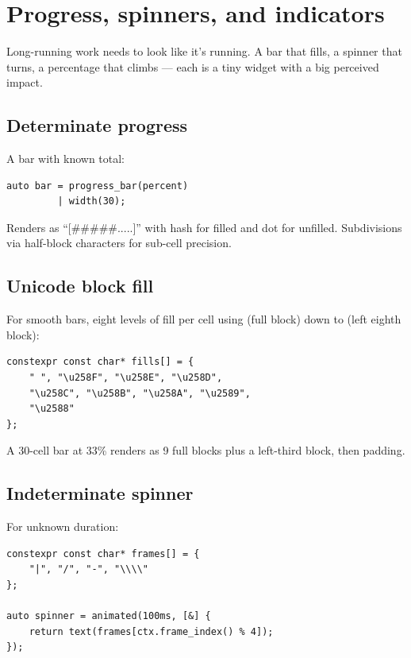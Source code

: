 \chapter{Progress, spinners, and indicators}
\label{ch:progress}

\begin{aside}
Long-running work needs to look like it's running. A bar that
fills, a spinner that turns, a percentage that climbs --- each
is a tiny widget with a big perceived impact.
\end{aside}

\section{Determinate progress}

A bar with known total:

\begin{lstlisting}
auto bar = progress_bar(percent)
         | width(30);
\end{lstlisting}

Renders as ``[\#\#\#\#\#.....]'' with hash for filled and
dot for unfilled. Subdivisions via half-block characters
for sub-cell precision.

\section{Unicode block fill}

For smooth bars, eight levels of fill per cell using
 (full block) down to  (left
eighth block):

\begin{lstlisting}
constexpr const char* fills[] = {
    " ", "\u258F", "\u258E", "\u258D",
    "\u258C", "\u258B", "\u258A", "\u2589",
    "\u2588"
};
\end{lstlisting}

A 30-cell bar at 33\% renders as 9 full blocks plus a
left-third block, then padding.

\section{Indeterminate spinner}

For unknown duration:

\begin{lstlisting}
constexpr const char* frames[] = {
    "|", "/", "-", "\\\\"
};

auto spinner = animated(100ms, [&] {
    return text(frames[ctx.frame_index() % 4]);
});
\end{lstlisting}

